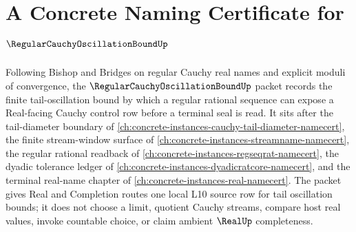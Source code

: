 \chapter{A Concrete Naming Certificate for $\RegularCauchyOscillationBoundUp$}
\label{ch:concrete-instances-regular-cauchy-oscillation-bound-namecert}

Following Bishop and Bridges on regular Cauchy real names and explicit moduli of convergence, the $\RegularCauchyOscillationBoundUp$ packet records the finite tail-oscillation bound by which a regular rational sequence can expose a Real-facing Cauchy control row before a terminal seal is read. It sits after the tail-diameter boundary of \autoref{ch:concrete-instances-cauchy-tail-diameter-namecert}, the finite stream-window surface of \autoref{ch:concrete-instances-streamname-namecert}, the regular rational readback of \autoref{ch:concrete-instances-regseqrat-namecert}, the dyadic tolerance ledger of \autoref{ch:concrete-instances-dyadicratcore-namecert}, and the terminal real-name chapter of \autoref{ch:concrete-instances-real-namecert}. The packet gives Real and Completion routes one local L10 source row for tail oscillation bounds; it does not choose a limit, quotient Cauchy streams, compare host real values, invoke countable choice, or claim ambient $\RealUp$ completeness.


